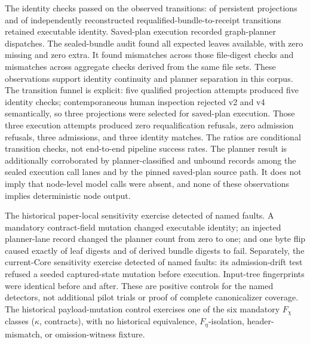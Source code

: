 \documentclass[11pt]{article}
\begin{document}
The identity checks passed on the observed transitions:
\PersistentIdentityCount{} of \QualifiedPlanCount{} persistent projections and
\RecomputedAdmissionIdentityCount{} of \ExecutionCount{} independently
reconstructed requalified-bundle-to-receipt transitions retained executable
identity. Saved-plan execution recorded
\ExecutionPlannerDispatches{} graph-planner dispatches. The sealed-bundle audit
found all \ManifestFileCount{} expected leaves available, with zero missing and
zero extra. It found \ManifestFileMismatchCount{} mismatches across those
\ManifestFileCount{} file-digest checks and
\ManifestBundleMismatchCount{} mismatches across \ManifestBundleCount{}
aggregate checks derived from the same file sets. These
observations support identity continuity and planner separation in this corpus.
The transition funnel is explicit: five qualified projection attempts produced
five identity checks; contemporaneous human inspection rejected v2 and v4
semantically, so three projections were selected for saved-plan execution.
Those three execution attempts produced zero
requalification refusals, zero admission refusals, three admissions, and three
identity matches. The ratios are conditional transition checks, not end-to-end
pipeline success rates.
The planner result is additionally corroborated by
\PlannerClassifiedCallLaneRecordCount{} planner-classified and
\UnboundCallLaneRecordCount{} unbound records among the sealed execution call
lanes and by the pinned
saved-plan source path.  It does not imply that node-level model calls were
absent, and none of these observations implies deterministic node output.

The historical paper-local sensitivity exercise detected
\HistoricalDetectorControlPassCount{} of
\HistoricalDetectorControlCount{} named faults. A
mandatory contract-field mutation changed executable identity; an injected
planner-lane record changed the planner count from zero to one; and one byte
flip caused exactly \DetectorLeafFailureCount{} of \ManifestFileCount{} leaf
digests and \DetectorBundleFailureCount{} of \ManifestBundleCount{} derived
bundle digests to fail. Separately, the current-Core sensitivity exercise
detected \CurrentDetectorControlPassCount{} of
\CurrentDetectorControlCount{} named faults: its admission-drift test refused
a seeded captured-state mutation before execution. Input-tree fingerprints were
identical before and after. These are positive controls for the named
detectors, not additional pilot trials or proof of complete canonicalizer
coverage. The historical payload-mutation control exercises one of the six
mandatory \(F_\chi\) classes (\(\kappa\), contracts), with no historical
equivalence, \(F_\eta\)-isolation, header-mismatch, or omission-witness
fixture.
\end{document}

